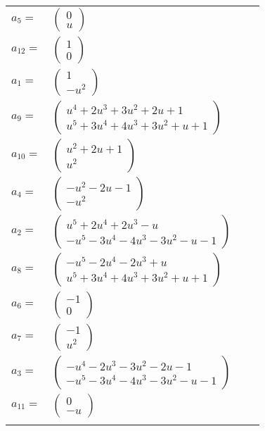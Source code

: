 \documentclass[1p]{elsarticle_modified}
\theoremstyle{definition}
\begin{document}
\begin{tabular}{m{7pt} m{180pt} m{7pt} m{180pt} }
\flushright $a_{5}=$&$\begin{pmatrix}0\\u\end{pmatrix}$ \\
\flushright $a_{12}=$&$\begin{pmatrix}1\\0\end{pmatrix}$ \\
\flushright $a_{1}=$&$\begin{pmatrix}1\\- u^2\end{pmatrix}$ \\
\flushright $a_{9}=$&$\begin{pmatrix}u^4+2 u^3+3 u^2+2 u+1\\u^5+3 u^4+4 u^3+3 u^2+u+1\end{pmatrix}$ \\
\flushright $a_{10}=$&$\begin{pmatrix}u^2+2 u+1\\u^2\end{pmatrix}$ \\
\flushright $a_{4}=$&$\begin{pmatrix}- u^2-2 u-1\\- u^2\end{pmatrix}$ \\
\flushright $a_{2}=$&$\begin{pmatrix}u^5+2 u^4+2 u^3- u\\- u^5-3 u^4-4 u^3-3 u^2- u-1\end{pmatrix}$ \\
\flushright $a_{8}=$&$\begin{pmatrix}- u^5-2 u^4-2 u^3+u\\u^5+3 u^4+4 u^3+3 u^2+u+1\end{pmatrix}$ \\
\flushright $a_{6}=$&$\begin{pmatrix}-1\\0\end{pmatrix}$ \\
\flushright $a_{7}=$&$\begin{pmatrix}-1\\u^2\end{pmatrix}$ \\
\flushright $a_{3}=$&$\begin{pmatrix}- u^4-2 u^3-3 u^2-2 u-1\\- u^5-3 u^4-4 u^3-3 u^2- u-1\end{pmatrix}$ \\
\flushright $a_{11}=$&$\begin{pmatrix}0\\- u\end{pmatrix}$\\&\end{tabular}
\end{document}
